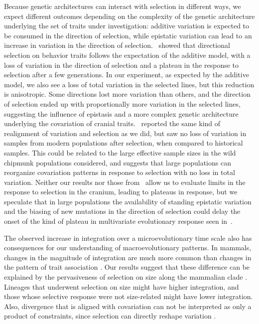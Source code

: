 \begin{refsection}
Because genetic architectures can interact with selection in different
ways, we expect different outcomes depending on the complexity of the
genetic architecture underlying the set of traits under investigation:
additive variation is expected to be consumed in the direction of
selection, while epistatic variation can lead to an increase in
variation in the direction of selection.~\textcite{Careau2015-sy} showed that
directional selection on behavior traits follows the expectation of the
additive model, with a loss of variation in the direction of selection
and a plateau in the response to selection after a few generations. In
our experiment, as expected by the additive model, we also see a loss of
total variation in the selected lines, but this reduction is
anisotropic. Some directions lost more variation than others, and the
direction of selection ended up with proportionally more variation in
the selected lines, suggesting the influence of epistasis and a more
complex genetic architecture underlying the covariation of cranial
traits.~\textcite{Assis2016-vz} reported the same kind of realignment of variation
and selection as we did, but saw no loss of variation in samples from
modern populations after selection, when compared to historical samples.
This could be related to the large effective sample sizes in the wild
chipmunk populations considered, and suggests that large populations can
reorganize covariation patterns in response to selection with no loss in
total variation. Neither our results nor those from~\textcite{Assis2016-vz} allow us
to evaluate limits in the response to selection in the cranium, leading
to plateaus in response, but we speculate that in large populations the
availability of standing epistatic variation and the biasing of new
mutations in the direction of selection could delay the onset of the
kind of plateau in multivariate evolutionary response seen
in~\textcite{Careau2015-sy}.

The observed increase in integration over a microevolutionary time scale
also has consequences for our understanding of macroevolutionary
patterns. In mammals, changes in the magnitude of integration are much
more common than changes in the pattern of trait association
\parencite{Porto2009-pi}. Our results suggest that these difference can be
explained by the pervasiveness of selection on size along the mammalian
clade \parencite{Marroig2005-ce, Baker2015-ti}. Lineages that underwent selection
on size might have higher integration, and those whose selective
response were not size-related might have lower integration. Also,
divergence that is aligned with covariation can not be interpreted as
only a product of constraints, since selection can directly reshape
variation \parencite{Punzalan2016-lb}.


\end{refsection}
